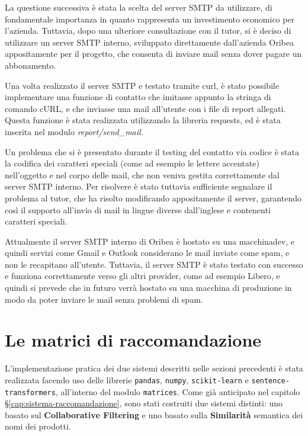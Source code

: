 La questione successiva è stata la scelta del server SMTP da utilizzare, di fondamentale importanza in quanto rappresenta un investimento economico per l'azienda.
Tuttavia, dopo una ulteriore consultazione con il tutor, si è deciso di utilizzare un server SMTP interno, sviluppato direttamente dall'azienda Oribea appositamente per il progetto, che consenta di inviare mail senza dover pagare un abbonamento.

Una volta realizzato il server SMTP e testato tramite \gls{curl}, è stato possibile implementare una funzione di contatto che imitasse appunto la stringa di comando cURL, e che inviasse una mail all'utente con i file di report allegati. Questa funzione è stata realizzata utilizzando la libreria \gls{requests}, ed è stata inserita nel modulo \emph{report/send\_mail}.

Un problema che si è presentato durante il testing del contatto via codice è stata la codifica dei caratteri speciali (come ad esempio le lettere accentate) nell'oggetto e nel corpo delle mail, che non veniva gestita correttamente dal server SMTP interno. Per risolvere è stato tuttavia sufficiente segnalare il problema al tutor, che ha risolto modificando appositamente il server, garantendo così il supporto all'invio di mail in lingue diverse dall'inglese e contenenti caratteri speciali.

Attualmente il server SMTP interno di Oribea è hostato su una \gls{macchinadev}, e quindi servizi come Gmail e Outlook considerano le mail inviate come spam, e non le recapitano all'utente. Tuttavia, il server SMTP è stato testato con successo e funziona correttamente verso gli altri provider, come ad esempio Libero, e quindi si prevede che in futuro verrà hostato su una macchina di produzione in modo da poter inviare le mail senza problemi di spam.


\section{Le matrici di raccomandazione}

L'implementazione pratica dei due sistemi descritti nelle sezioni precedenti è stata realizzata facendo uso delle librerie \texttt{pandas}, \texttt{numpy}, \texttt{scikit-learn} e \texttt{sentence-transformers}, all'interno del modulo \texttt{matrices}. Come già anticipato nel capitolo \S\ref{cap:sistema-raccomandazione}, sono stati costruiti due sistemi distinti: uno basato sul \textbf{Collaborative Filtering} e uno basato sulla \textbf{Similarità} semantica dei nomi dei prodotti.

